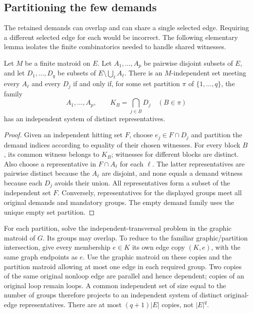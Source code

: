 \subsection{Partitioning the few demands}

The retained demands can overlap and can share a single selected edge.
Requiring a different selected edge for each would be incorrect. The
following elementary lemma isolates the finite combinatorics needed to
handle shared witnesses.

\begin{lemma}
\label{lem:fpt-partition-reduction}
Let $M$ be a finite matroid on $E$. Let $A_1,\ldots,A_p$ be pairwise
disjoint subsets of $E$, and let $D_1,\ldots,D_q$ be subsets of
$E\setminus\bigcup_\ell A_\ell$. There is an $M$-independent set
meeting every $A_\ell$ and every $D_j$ if and only if, for some set
partition $\pi$ of $\{1,\ldots,q\}$, the family
\[
       A_1,\ldots,A_p,\qquad
       K_B=\bigcap_{j\in B}D_j\quad(B\in\pi)
\]
has an independent system of distinct representatives.
\end{lemma}
\begin{proof}
Given an independent hitting set $F$, choose $e_j\in F\cap D_j$ and
partition the demand indices according to equality of their chosen
witnesses. For every block $B$, its common witness belongs to $K_B$;
witnesses for different blocks are distinct. Also choose a representative
in $F\cap A_\ell$ for each $\ell$. The latter representatives are
pairwise distinct because the $A_\ell$ are disjoint, and none equals a
demand witness because each $D_j$ avoids their union. All representatives
form a subset of the independent set $F$. Conversely, representatives
for the displayed groups meet all original demands and mandatory groups.
The empty demand family uses the unique empty set partition.
\end{proof}

For each partition, solve the independent-transversal problem in the
graphic matroid of $G$. Its groups may overlap. To reduce to the familiar
graphic/partition intersection, give every membership $e\in K$ its own
edge copy $(K,e)$, with the same graph endpoints as $e$. Use the graphic
matroid on these copies and the partition matroid allowing at most one
edge in each required group. Two copies of the same original nonloop
edge are parallel and hence dependent; copies of an original loop remain
loops. A common independent set of size equal to the number of groups
therefore projects to an independent system of distinct original-edge
representatives. There are at most $(q+1)|E|$ copies, not $|E|^q$.

